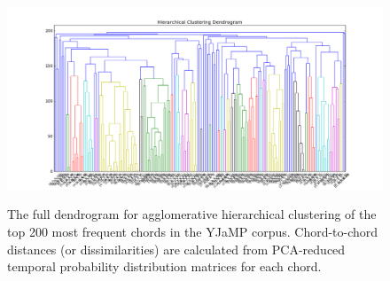\begin{landscape}
\begin{figure}
	\centering
	\caption{The full dendrogram for agglomerative hierarchical clustering of the top 200 most frequent chords in the YJaMP corpus.  Chord-to-chord distances (or dissimilarities) are calculated from PCA-reduced temporal probability distribution matrices for each chord.}
	\includegraphics[width=9in]{Dendrogram_complete.png}
	\label{Dend_complete}
\end{figure}
\end{landscape}

